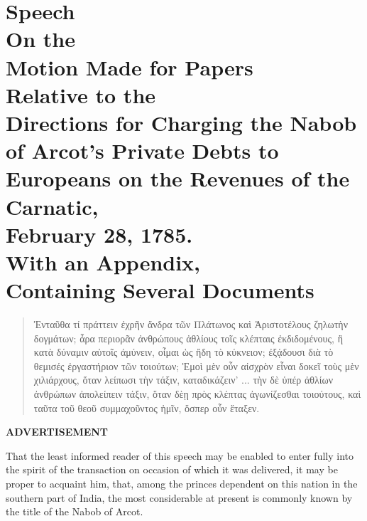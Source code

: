 \chapter*[Speech on the Nabob of Arcot's Debts]{
Speech
\\{\small On the}
\\Motion Made for Papers
\\{\small Relative to the}
\\Directions for Charging the Nabob of Arcot's Private Debts to Europeans on the Revenues of the Carnatic,
\\{\small February 28, 1785.}
\\With an Appendix,
\\{\small Containing Several Documents}
}

\begin{quotation}
{\g Ἐνταῦθα τί πράττειν ἐχρῆν ἄνδρα τῶν Πλάτωνος καὶ Ἀριστοτέλους ζηλωτὴν δογμάτων; ἆρα περιορᾶν ἀνθρώπους ἀθλίους τοῖς κλέπταις ἐκδιδομένους, ἢ κατὰ δύναμιν αὐτοῖς ἀμύνειν, οἶμαι ὡς ἤδη τὸ κύκνειον; ἐξᾴδουσι διὰ τὸ θεμισές ἐργαστήριον τῶν τοιούτων; Ἐμοὶ μὲν οὖν αἰσχρὸν εἶναι δοκεῖ τοὺς μὲν χιλιάρχους, ὅταν λείπωσι τὴν τάξιν, καταδικάζειν' ... τὴν δὲ ὑπέρ ἀθλίων ἀνθρώπων ἀπολείπειν τάξιν, ὅταν δὲῃ πρὸς κλέπτας ἀγωνίζεσθαι τοιούτους, καὶ ταῦτα τοῦ θεοῦ συμμαχοῦντος ἡμῖν, ὅσπερ οὖν ἔταξεν.}
\end{quotation}

\vspace{0.3cm}
\begin{center}
  \textbf{\large ADVERTISEMENT} \par 
\end{center}

That the least informed reader of this speech may be enabled to enter fully into the spirit of the transaction on occasion of which it was delivered, it may be proper to acquaint him, that, among the princes dependent on this nation in the southern part of India, the most considerable at present is commonly known by the title of the Nabob of Arcot.

